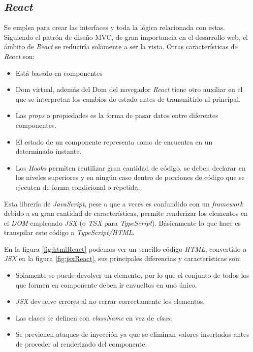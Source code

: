 \subsection{\textit{React} }
Se emplea para crear las interfaces y toda la lógica relacionada con estas. Siguiendo el patrón de diseño MVC, de gran importancia en el desarrollo web,  el ámbito de \textit{React} se reduciría solamente a ser la vista. Otras características de  \textit{React} \cite{eswiki:149441191} son:
\begin{itemize}
    \item Está basado en componentes
    \item Dom virtual, además del Dom del navegador \textit{React} tiene otro auxiliar en el que se interpretan los cambios de estado antes de transmitirlo al principal.
    \item Las \textit{props} o propiedades es la forma de pasar datos entre diferentes componentes.
    \item El estado de un componente representa como de encuentra en un determinado instante.
    \item Los \textit{Hooks} permiten reutilizar gran cantidad de código, se deben declarar en los niveles superiores y en ningún caso dentro de porciones de código que se ejecuten de forma condicional o repetida.
\end{itemize}

Esta librería de \textit{JavaScript}, pese a que a veces es confundido con un \textit{framework} debido a su gran cantidad de características, permite renderizar los elementos en el \textit{DOM} empleando \textit{JSX} (o \textit{TSX} para \textit{TypeScript}). Básicamente lo que hace es transpilar este código a \textit{TypeScript/HTML}.



En la figura \ref{fig:htmlReact}  podemos ver un sencillo código \textit{HTML}, convertido a \textit{JSX} en la figura \ref{fig:jsxReact}, sus principales diferencias y características son:
\begin{itemize}
    \item Solamente se puede devolver un elemento, por lo que el conjunto de todos los que formen en componente deben ir envueltos en uno único.
    \item \textit{JSX} devuelve errores al no cerrar correctamente los elementos.
    \item Las clases se definen con \textit{className} en vez de \textit{class}.
    \item Se previenen ataques de inyección \cite{reactjsPresentandoReact} ya que se eliminan valores insertados antes de proceder al renderizado del componente.
\end{itemize}

